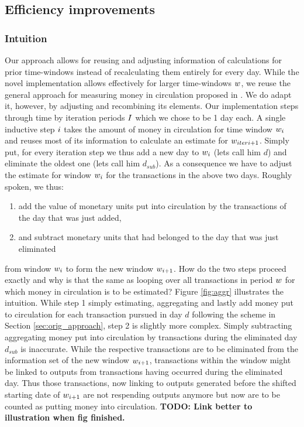 \subsection{Efficiency improvements}
\label{sec:novel_impl}%

\subsubsection{Intuition}
\label{sec:novel_impl_intuition}%
Our approach allows for reusing and adjusting information of calculations for prior time-windows instead of recalculating them entirely for every day. %
While the novel implementation allows effectively for larger time-windows \({{w}}\), we reuse the general approach for measuring money in circulation proposed in \cite{pernice2019cryptocurrencies}. %
We do adapt it, however, by adjusting and recombining its elements. %
Our implementation steps through time by iteration periods \({I}\) which we chose to be 1 day each. %
A single inductive step \({i}\) takes the amount of money in circulation for time window \({w}_{i}\) and reuses most of its information to calculate an estimate for \({w}_{iteri+1}\). %
Simply put, for every iteration step we thus add a new day to \({w}_{{i}}\) (lets call him \(d\)) and eliminate the oldest one (lets call him \(d_{sub}\)). %
As a consequence we have to adjust the estimate for window \({w}_{i}\) for the transactions in the above two days. %
Roughly spoken, we thus:
\begin{enumerate}
\item add the value of monetary units put into circulation by the transactions of the day that was just added, %
\item and subtract monetary units that had belonged to the day that was just eliminated %
\end{enumerate}
from window \({w}_{{i}}\) to form the new window \({w}_{{i}+1}\). %
How do the two steps proceed exactly and why is that the same as looping over all transactions in period \({w}\) for which money in circulation is to be estimated?
Figure \ref{fig:aggr} illustrates the intuition. %
While step 1 simply estimating, aggregating and lastly add money put to circulation for each transaction pursued in day \(d\) following the scheme in Section \ref{sec:orig_approach}, step 2 is slightly more complex. %
Simply subtracting aggregating money put into circulation by transactions during the eliminated day \(d_{sub}\) is inaccurate. %
While the respective transactions are to be eliminated from the information set of the new window \({w}_{{i}+1}\), transactions within the window might be linked to outputs from transactions having occurred during the eliminated day. %
Thus those transactions, now linking to outputs generated before the shifted starting date of \({w}_{{i}+1}\) are not respending outputs anymore but now are to be counted as putting money into circulation. %
\textbf{TODO: Link better to illustration when fig finished.}



